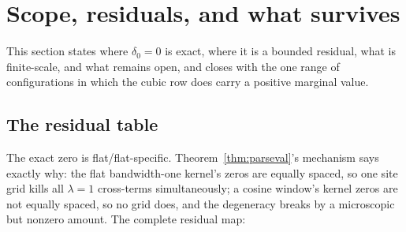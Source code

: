 \documentclass[11pt]{article}
\theoremstyle{plain}
\theoremstyle{definition}
\theoremstyle{remark}
\begin{document}
\section{Scope, residuals, and what survives}
\label{sec:scope}

This section states where $\delta_0 = 0$ is exact, where it is a bounded
residual, what is finite-scale, and what remains open, and closes with the one
range of configurations in which the cubic row does carry a positive marginal
value.

\subsection{The residual table}

The exact zero is flat/flat-specific. Theorem~\ref{thm:parseval}'s
mechanism says exactly why: the flat bandwidth-one kernel's zeros are equally
spaced, so one site grid kills all $\lambda = 1$ cross-terms simultaneously; a
cosine window's kernel zeros are not equally spaced, so no grid does, and the
degeneracy breaks by a microscopic but nonzero amount. The complete residual map:
\end{document}
